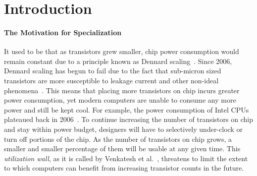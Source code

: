 \section{Introduction}

\paragraph{The Motivation for Specialization}
It used to be that as transistors grew smaller, chip power consumption would remain constant due to a principle known as Dennard scaling~\cite{dennardscaling}. Since 2006, Dennard scaling has begun to fail due to the fact that sub-micron sized transistors are more susceptible to leakage current and other non-ideal phenomena~\cite{dennard_end}. This means that placing more transistors on chip incurs greater power consumption, yet modern computers are unable to consume any more power and still be kept cool. For example, the power consumption of Intel CPUs plateaued back in 2006~\cite{hruska_2012}. To continue increasing the number of transistors on chip and stay within power budget, designers will have to selectively under-clock or turn off portions of the chip. As the number of transistors on chip grows, a smaller and smaller percentage of them will be usable at any given time. This \textit{utilization wall}, as it is called by Venkatesh et al.~\cite{Venkatesh:2010}, threatens to limit the extent to which computers can benefit from increasing transistor counts in the future.

